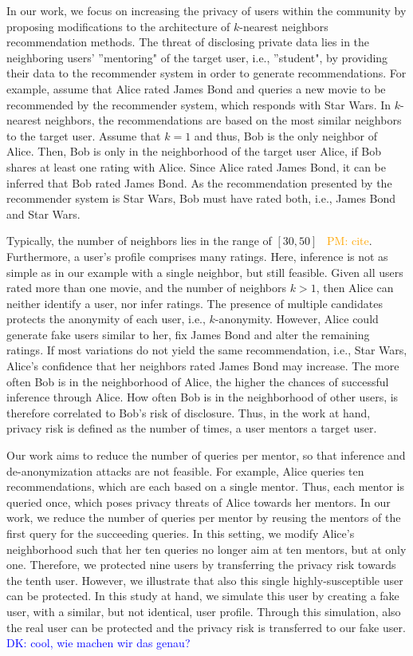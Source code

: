 \documentclass[manuscript,review,anonymous]{acmart}
\newcommand{\dk}[1]{
        \textcolor{blue}{DK: #1}}
\newcommand{\pmu}[1]{
        \textcolor{orange}{PM: #1}}
\begin{document}
In our work, we focus on increasing the privacy of users within the community by proposing modifications to the architecture of $k$-nearest neighbors recommendation methods.
The threat of disclosing private data lies in the neighboring users' ''mentoring" of the target user, i.e., ''student", by providing their data to the recommender system in order to generate recommendations.
For example, assume that Alice rated James Bond and queries a new movie to be recommended by the recommender system, which responds with Star Wars.
In $k$-nearest neighbors, the recommendations are based on the most similar neighbors to the target user.
Assume that $k=1$ and thus, Bob is the only neighbor of Alice.
Then, Bob is only in the neighborhood of the target user Alice, if Bob shares at least one rating with Alice.
Since Alice rated James Bond, it can be inferred that Bob rated James Bond.
As the recommendation presented by the recommender system is Star Wars, Bob must have rated both, i.e., James Bond and Star Wars.

Typically, the number of neighbors lies in the range of $[30, 50]$~\pmu{cite}.
Furthermore, a user's profile comprises many ratings.
Here, inference is not as simple as in our example with a single neighbor, but still feasible.
Given all users rated more than one movie, and the number of neighbors $k>1$, then Alice can neither identify a user, nor infer ratings.
The presence of multiple candidates protects the anonymity of each user, i.e., $k$-anonymity.
However, Alice could generate fake users similar to her, fix James Bond and alter the remaining ratings.
If most variations do not yield the same recommendation, i.e., Star Wars, Alice's confidence that her neighbors rated James Bond may increase.
The more often Bob is in the neighborhood of Alice, the higher the chances of successful inference through Alice.
How often Bob is in the neighborhood of other users, is therefore correlated to Bob's risk of disclosure.
Thus, in the work at hand, privacy risk is defined as the number of times, a user mentors a target user.



Our work aims to reduce the number of queries per mentor, so that inference and de-anonymization attacks are not feasible. 
For example, Alice queries ten recommendations, which are each based on a single mentor.
Thus, each mentor is queried once, which poses privacy threats of Alice towards her mentors.
In our work, we reduce the number of queries per mentor by reusing the mentors of the first query for the succeeding queries.
In this setting, we modify Alice's neighborhood such that her ten queries no longer aim at ten mentors, but at only one.
Therefore, we protected nine users by transferring the privacy risk towards the tenth user.
However, we illustrate that also this single highly-susceptible user can be protected.
In this study at hand, we simulate this user by creating a fake user, with a similar, but not identical, user profile.
Through this simulation, also the real user can be protected and the privacy risk is transferred to our fake user. \dk{cool, wie machen wir das genau?}
\end{document}
